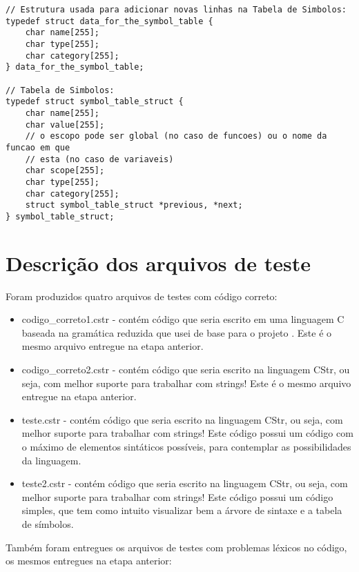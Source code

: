 \documentclass[12pt]{article}
\begin{document}
\begin{lstlisting}
// Estrutura usada para adicionar novas linhas na Tabela de Simbolos:
typedef struct data_for_the_symbol_table {
    char name[255];
    char type[255];
    char category[255];
} data_for_the_symbol_table;

// Tabela de Simbolos:
typedef struct symbol_table_struct {
    char name[255];
    char value[255];
    // o escopo pode ser global (no caso de funcoes) ou o nome da funcao em que
    // esta (no caso de variaveis)
    char scope[255];
    char type[255];
    char category[255];
    struct symbol_table_struct *previous, *next;
} symbol_table_struct;
\end{lstlisting}

\section{Descrição dos arquivos de teste}

\indent

Foram produzidos quatro arquivos de testes com código correto:

\begin{itemize}
	\item codigo\_correto1.cstr - contém código que seria escrito em uma linguagem C baseada na gramática reduzida que usei de base para o projeto \cite{minic}. Este é o mesmo arquivo entregue na etapa anterior.
	\item codigo\_correto2.cstr - contém código que seria escrito na linguagem CStr, ou seja, com melhor suporte para trabalhar com strings! Este é o mesmo arquivo entregue na etapa anterior.
	\item teste.cstr - contém código que seria escrito na linguagem CStr, ou seja, com melhor suporte para trabalhar com strings! Este código possui um código com o máximo de elementos sintáticos possíveis, para contemplar as possibilidades da linguagem.
	\item teste2.cstr - contém código que seria escrito na linguagem CStr, ou seja, com melhor suporte para trabalhar com strings! Este código possui um código simples, que tem como intuito visualizar bem a árvore de sintaxe e a tabela de símbolos.\\
\end{itemize}

Também foram entregues os arquivos de testes com problemas léxicos no código, os mesmos entregues na etapa anterior:
\end{document}
